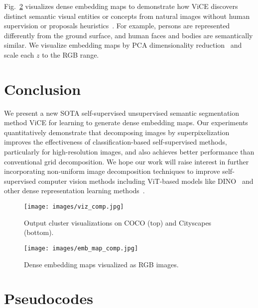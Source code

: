 \documentclass{bmvc2k}
\begin{document}
Fig.~\ref{fig:viz_embs} visualizes dense embedding maps to demonstrate how ViCE discovers distinct semantic visual entities or concepts from natural images without human supervision or proposals heuristics~\cite{Uijlings2013SelectiveSearch, Bar2021DETReg}. For example, persons are represented differently from the ground surface, and human faces and bodies are semantically similar. We visualize embedding maps by PCA dimensionality reduction~\cite{Pearson1901PCA} and scale each $z$ to the RGB range.

\section{Conclusion}
\label{sec:conclusion}

We present a new SOTA self-supervised unsupervised semantic segmentation method ViCE for learning to generate dense embedding maps. Our experiments quantitatively demonstrate that decomposing images by superpixelization improves the effectiveness of classification-based self-supervised methods, particularly for high-resolution images, and also achieves better performance than conventional grid decomposition. We hope our work will raise interest in further incorporating non-uniform image decomposition techniques to improve self-supervised computer vision methods including ViT-based models like DINO~\cite{Caron2021DINO} and other dense representation learning methods~\cite{Pinheiro2020VADeR, Wang2012DenseCL, Li2021DSCL, Xie2021PixPro}.

\begin{figure}
\begin{center}
\texttt{[image: images/viz\_comp.jpg]}
\end{center}
   \caption{Output cluster visualizations on COCO (top) and Cityscapes (bottom).}
\label{fig:viz_unsup_clustering}
\end{figure}

\begin{figure}
\begin{center}
\texttt{[image: images/emb\_map\_comp.jpg]}
\end{center}
   \caption{Dense embedding maps visualized as RGB images.}
\label{fig:viz_embs}
\end{figure}

\appendix

\section{Pseudocodes}
\label{sec:sup_a}
\end{document}
